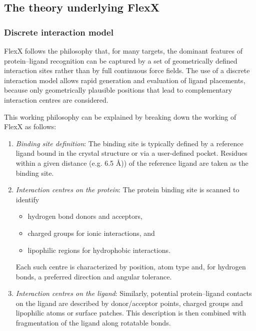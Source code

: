 \documentclass[12pt, a4paper]{article}
\begin{document}
\subsection{The theory underlying FlexX}

\subsubsection{Discrete interaction model}

FlexX follows the philosophy that, for many targets, the dominant features of protein--ligand recognition can be captured by a set of geometrically defined interaction sites rather than by full continuous force fields.\cite{CH7_rarey1996,CH7_bohm1994} The use of a discrete interaction model allows rapid generation and evaluation of ligand placements, because only geometrically plausible positions that lead to complementary interaction centres are considered.

This working philosophy can be explained by breaking down the working of FlexX as follows:
\begin{enumerate}
  \item \textit{Binding site definition}: The binding site is typically defined by a reference ligand bound in the crystal structure or via a user-defined pocket. Residues within a given distance (e.g. 6.5 \r{A})) of the reference ligand are taken as the binding site.

  \item \textit{Interaction centres on the protein}: The protein binding site is scanned to identify
        \begin{itemize}
          \item hydrogen bond donors and acceptors,
          \item charged groups for ionic interactions, and
          \item lipophilic regions for hydrophobic interactions.
        \end{itemize}
    Each such centre is characterized by position, atom type and, for hydrogen bonds, a preferred direction and angular tolerance.

  \item \textit{Interaction centres on the ligand}: Similarly, potential protein--ligand contacts on the ligand are described by donor/acceptor points, charged groups and lipophilic atoms or surface patches. This description is then combined with fragmentation of the ligand along rotatable bonds.
\end{enumerate}
\end{document}
